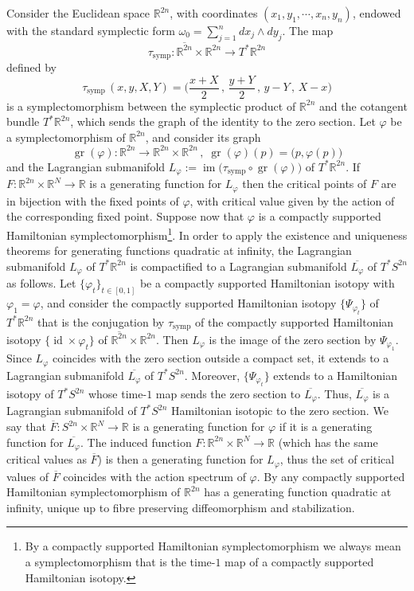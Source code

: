 \documentclass{amsart}
\DeclareMathOperator{\gr}{gr}
\DeclareMathOperator{\im}{im}
\DeclareMathOperator{\id}{id}
\DeclareMathOperator{\symp}{symp}
\theoremstyle{remark}
\begin{document}
Consider the Euclidean space $\mathbb{R}^{2n}$,
with coordinates $(x_1, y_1, \cdots, x_n, y_n)$,
endowed with the standard symplectic form
$\omega_0 = \sum_{j=1}^n dx_j \wedge dy_j$.
The map
\[
\tau_{\symp}: \overline{\mathbb{R}^{2n}} \times \mathbb{R}^{2n}
\rightarrow T^{\ast} \mathbb{R}^{2n}
\]
defined by
\[
\tau_{\symp} \, (x, y, X, Y) =
\Big(\frac{ x + X}{2} \,,\,
\frac{ y + Y}{2}
\,,\, y -  Y \,,\, X - x\Big)
\]
is a symplectomorphism
between the symplectic product of $\mathbb{R}^{2n}$ 
and the cotangent bundle $T^{\ast} \mathbb{R}^{2n}$,
which sends the graph of the identity
to the zero section.
Let $\varphi$ be a symplectomorphism of $\mathbb{R}^{2n}$,
and consider its graph
\[
\gr (\varphi): \mathbb{R}^{2n} \rightarrow
\mathbb{R}^{2n} \times \mathbb{R}^{2n}  \,,\;
\gr(\varphi)(p) = \big( p, \varphi(p) \big)
\]
and the Lagrangian submanifold
$L_{\varphi} := \im \big( \tau_{\symp} \circ \gr(\varphi) \big)$
of $T^{\ast}\mathbb{R}^{2n}$.
If $F: \mathbb{R}^{2n} \times \mathbb{R}^N \rightarrow \mathbb{R}$
is a generating function for $L_{\varphi}$
then the critical points of $F$
are in bijection with the fixed points of $\varphi$,
with critical value given by the action
of the corresponding fixed point.
Suppose now that $\varphi$
is a compactly supported Hamiltonian symplectomorphism\footnote{
By a compactly supported Hamiltonian symplectomorphism
we always mean a symplectomorphism
that is the time-$1$ map of a compactly supported Hamiltonian isotopy.}.
In order to apply the existence and uniqueness theorems
for generating functions quadratic at infinity,
the Lagrangian submanifold $L_{\varphi}$
of $T^{\ast}\mathbb{R}^{2n}$
is compactified to a Lagrangian submanifold
$\overline{L_{\varphi}}$ of $T^{\ast} S^{2n}$
as follows.
Let $\{\varphi_t\}_{t \in [0,1]}$
be a compactly supported Hamiltonian isotopy with $\varphi_1 = \varphi$,
and consider the compactly supported Hamiltonian isotopy $\{\Psi_{\varphi_t}\}$
of $T^{\ast} \mathbb{R}^{2n}$
that is the conjugation by $\tau_{\symp}$
of the compactly supported Hamiltonian isotopy
$\{ \id \times \varphi_t \}$
of $\overline{\mathbb{R}^{2n}} \times \mathbb{R}^{2n}$.
Then $L_{\varphi}$ is the image of the zero section by $\Psi_{\varphi_1}$.
Since $L_{\varphi}$ coincides with the zero section
outside a compact set,
it extends to a Lagrangian submanifold
$\overline{L_{\varphi}}$ of $T^{\ast} S^{2n}$.
Moreover,
$\{\Psi_{\varphi_t}\}$ extends to a Hamiltonian isotopy of $T^{\ast}S^{2n}$
whose time-$1$ map sends the zero section to $\overline{L_{\varphi}}$.
Thus,
$\overline{L_{\varphi}}$ is a Lagrangian submanifold of $T^{\ast} S^{2n}$
Hamiltonian isotopic to the zero section.
We say that $\overline{F}: S^{2n} \times \mathbb{R}^N \rightarrow \mathbb{R}$
is a generating function for $\varphi$
if it is a generating function for $\overline{L_{\varphi}}$.
The induced function $F: \mathbb{R}^{2n} \times \mathbb{R}^N \rightarrow \mathbb{R}$
(which has the same critical values as $\overline{F}$)
is then a generating function for $L_{\varphi}$,
thus the set of critical values of $\overline{F}$
coincides with the action spectrum of $\varphi$.
By \cite{Sikorav87, Viterbo, Theret}
any compactly supported Hamiltonian symplectomorphism of $\mathbb{R}^{2n}$
has a generating function quadratic at infinity,
unique up to fibre preserving diffeomorphism and stabilization.
\end{document}
